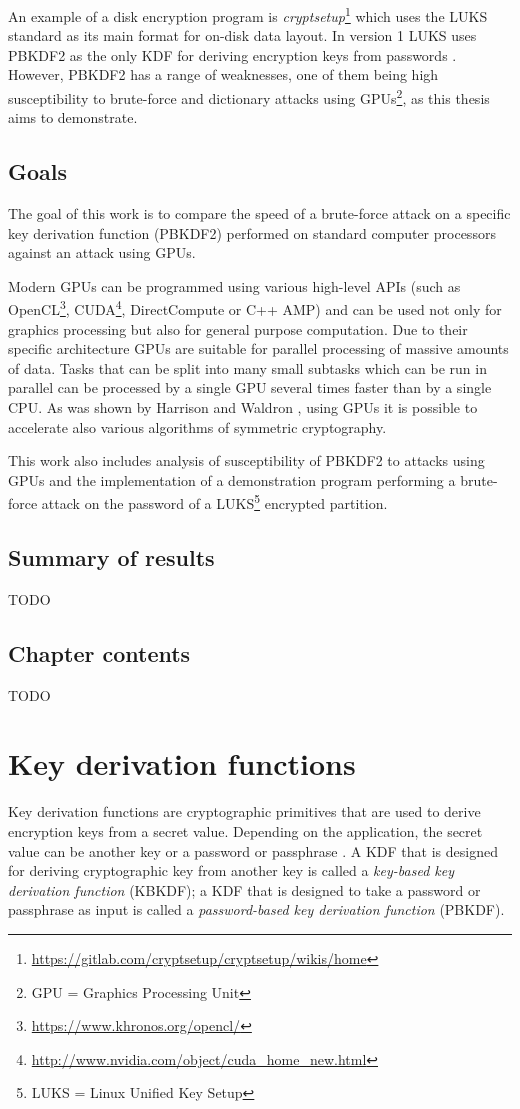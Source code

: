 \documentclass[12pt,oneside]{fithesis2}
\begin{document}
      An example of a disk encryption program is \emph{cryptsetup}\footnote{\url{https://gitlab.com/cryptsetup/cryptsetup/wikis/home}} which uses the LUKS standard as its main format for on-disk data layout. In version 1 LUKS uses PBKDF2 as the only KDF for deriving encryption keys from passwords \cite{luks}. However, PBKDF2 has a range of weaknesses, one of them being high susceptibility to brute-force and dictionary attacks using GPUs\footnote{GPU = Graphics Processing Unit}, as this thesis aims to demonstrate.
    
      \section{Goals}
      The goal of this work is to compare the speed of a brute-force attack on a specific key derivation function (PBKDF2) performed on standard computer processors against an attack using GPUs.
      
      Modern GPUs can be programmed using various high-level APIs (such as OpenCL\footnote{\url{https://www.khronos.org/opencl/}}, CUDA\footnote{\url{http://www.nvidia.com/object/cuda_home_new.html}}, DirectCompute or C++ AMP) and can be used not only for graphics processing but also for general purpose computation. Due to their specific architecture GPUs are suitable for parallel processing of massive amounts of data. Tasks that can be split into many small subtasks which can be run in parallel can be processed by a single GPU several times faster than by a single CPU. As was shown by Harrison and Waldron \cite{Harrison}, using GPUs it is possible to accelerate also various algorithms of symmetric cryptography.
    
      This work also includes analysis of susceptibility of PBKDF2 to attacks using GPUs and the implementation of a demonstration program performing a brute-force attack on the password of a LUKS\footnote{LUKS = Linux Unified Key Setup} encrypted partition.
    
      \section{Summary of results}
      TODO
      
      \section{Chapter contents}
      TODO
    
    \chapter{Key derivation functions}
      Key derivation functions are cryptographic primitives that are used to derive encryption keys from a secret value. Depending on the application, the secret value can be another key or a password or passphrase \cite{wiki:KDF}. A KDF that is designed for deriving cryptographic key from another key is called a \emph{key-based key derivation function} (KBKDF); a KDF that is designed to take a password or passphrase as input is called a \emph{password-based key derivation function} (PBKDF).
      
\end{document}
